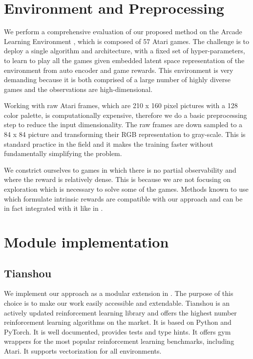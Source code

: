 

\section{Environment and Preprocessing}

We perform a comprehensive evaluation of our 
proposed method on the Arcade Learning Environment \cite{bellemare2013arcade}, 
which is composed of 57 Atari games. 
The challenge is to deploy a single algorithm and architecture, 
with a fixed set of hyper-parameters, 
to learn to play all the games given embedded latent space 
representation of the environment from auto encoder and game rewards. 
This environment is very demanding because it is both 
comprised of a large number of highly diverse games and the observations are high-dimensional.

Working with raw Atari frames, 
which are 210 x 160 pixel pictures with a 
128 color palette, is computationally expensive, therefore we do a 
basic preprocessing step to reduce the input dimensionality. 
The raw frames are down sampled to a 84 x 84 
picture and transforming their RGB representation to gray-scale.
This is standard practice in the field and it makes the training faster
without fundamentally simplifying the problem.

We constrict ourselves to games in which there is no partial observability and where
the reward is relatively dense. 
This is because we are not focusing on exploration which is necessary to solve some of the games.
Methods known to use which formulate intrinsic rewards are compatible with our approach
and can be in fact integrated with it like in \cite{exploratorysrl}.

\section{Module implementation}
\subsection{Tianshou}
We implement our approach as a modular extension in \cite{weng2021tianshou}.
The purpose of this choice is to make our work easily accessible and extendable.
Tianshou is an actively updated reinforcement learning library and offers the highest number reinforcement 
learning algorithms on the market.
It is based on Python and PyTorch.
It is well documented, provides tests and type hints.
It offers gym wrappers for the most popular reinforcement learning benchmarks, including
Atari.
It supports vectorization for all environments. 

